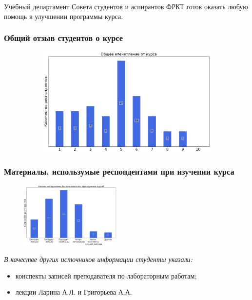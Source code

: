 	Учебный департамент Совета студентов и аспирантов ФРКТ готов оказать любую помощь в улучшении программы курса.

	\subsubsection{Общий отзыв студентов о курсе}

		\begin{figure}[H]
			\centering
			\begin{subfigure}[b]{0.45\textwidth}
				\centering
				\includegraphics[width=\textwidth]{images/3 course/Аналоговая электроника/general-0.png}
			\end{subfigure}
		\end{figure}

	\subsubsection{Материалы, использумые респондентами при изучении курса}

		\begin{figure}[H]
			\centering
			\includegraphics[width = 0.45\textwidth]{images/3 course/Аналоговая электроника/materials.png}
		\end{figure}

		\textit{В качестве других источников информации студенты указали:} 
		\begin{itemize}
			\item конспекты записей преподавателя по лабораторным работам;
			\item лекции Ларина А.Л. и Григорьева А.А.
		\end{itemize}

